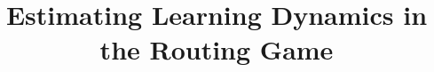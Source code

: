 \documentclass{sig-alternate-ipsn13}
\begin{document}
\title{Estimating Learning Dynamics in the Routing Game
}
%
%
%
%
%
\end{document}
